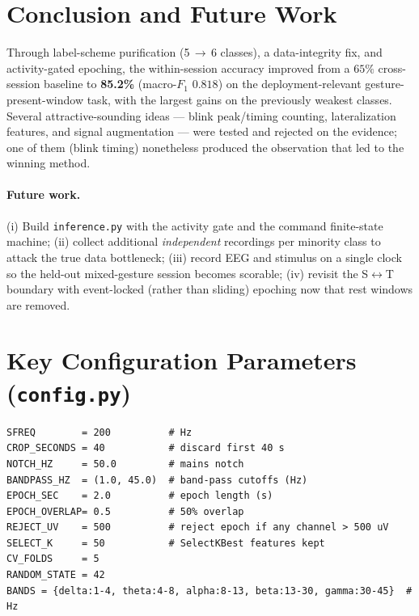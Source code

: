 \documentclass[11pt,a4paper]{article}
\newcommand{\fone}{$F_1$}
\newcommand{\code}[1]{\texttt{#1}}
\begin{document}
\section{Conclusion and Future Work}
Through label-scheme purification (5\,$\to$\,6 classes), a data-integrity fix,
and activity-gated epoching, the within-session accuracy improved from a $65\%$
cross-session baseline to \textbf{85.2\%} (macro-\fone{} $0.818$) on the
deployment-relevant gesture-present-window task, with the largest gains on the
previously weakest classes. Several attractive-sounding ideas --- blink
peak/timing counting, lateralization features, and signal augmentation --- were
tested and rejected on the evidence; one of them (blink timing) nonetheless
produced the observation that led to the winning method.

\paragraph{Future work.}
(i) Build \code{inference.py} with the activity gate and the command
finite-state machine; (ii) collect additional \emph{independent} recordings per
minority class to attack the true data bottleneck; (iii) record EEG and stimulus
on a single clock so the held-out mixed-gesture session becomes scorable;
(iv) revisit the S$\leftrightarrow$T boundary with event-locked (rather than
sliding) epoching now that rest windows are removed.

\appendix
\section{Key Configuration Parameters (\code{config.py})}
\begin{lstlisting}
SFREQ        = 200          # Hz
CROP_SECONDS = 40           # discard first 40 s
NOTCH_HZ     = 50.0         # mains notch
BANDPASS_HZ  = (1.0, 45.0)  # band-pass cutoffs (Hz)
EPOCH_SEC    = 2.0          # epoch length (s)
EPOCH_OVERLAP= 0.5          # 50% overlap
REJECT_UV    = 500          # reject epoch if any channel > 500 uV
SELECT_K     = 50           # SelectKBest features kept
CV_FOLDS     = 5
RANDOM_STATE = 42
BANDS = {delta:1-4, theta:4-8, alpha:8-13, beta:13-30, gamma:30-45}  # Hz
\end{lstlisting}
\end{document}
